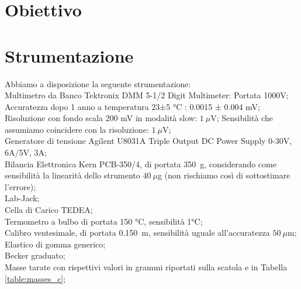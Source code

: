 \documentclass[italian, a4paper, 10pt, twocolumn]{../../style/lab_unige}
\newcommand{\reftab}[1]{Tabella {\ref{#1}}}%
\begin{document}

    \section{Obiettivo}
    \label{section:aim}


    \section{Strumentazione}
    \label{section:strument}

    Abbiamo a disposizione la seguente strumentazione:\\
    Multimetro da Banco Tektronix DMM 5-1/2 Digit Multimeter:
    Portata 1000V;
    Accuratezza dopo 1 anno a temperatura 23±5 °C : 0.0015 ± 0.004 mV;
    Risoluzione con fondo scala 200 mV in modalità slow: $1~\mu$V;
    Sensibilità che assumiamo coincidere con la risoluzione: $1~\mu$V;\\
    Generatore di tensione Agilent U8031A Triple Output DC Power Supply 0-30V, 6A/5V, 3A;\\
    Bilancia Elettronica Kern PCB-350/4, di portata 350~g, considerando come sensibilità la linearità dello strumento $40~\mu$g (non rischiamo così di sottostimare l'errore);\\
    Lab-Jack;\\
    Cella di Carico TEDEA;\\
    Termometro a bulbo di portata 150 °C, sensibilità 1°C;\\
    Calibro ventesimale, di portata 0.150~m, sensibilità uguale all'accuratezza $50~\mu$m;\\
    Elastico di gomma generico;\\
    Becker graduato;\\
    Masse tarate con rispettivi valori in grammi riportati sulla scatola e in \reftab{table:masses_c};\\
\end{document}
